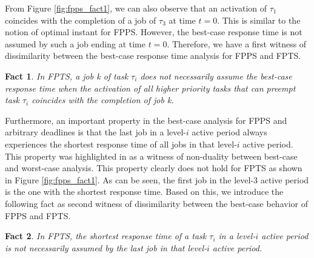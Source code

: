 \documentclass[conference,compsoc]{IEEEtran}
\newtheorem{fact}{Fact}
\begin{document}
From Figure \ref{fig:fpps_fact1}, we can also observe that an activation of $\tau_1$ coincides with the completion of a job of $\tau_3$ at time $t=0$. This is similar to the notion of optimal instant for FPPS. However, the best-case response time is not assumed by such a job ending at time $t=0$. Therefore, we have a first witness of dissimilarity between the best-case response time analysis for FPPS and FPTS.

\begin{fact}
	In FPTS, a job k of task $\tau_i$ does not necessarily assume the best-case response time when the activation of all higher priority tasks that can preempt task $\tau_i$ coincides with the completion of job k.
\end{fact}

Furthermore, an important property in the best-case analysis for FPPS and arbitrary deadlines is that the last job in a level-$i$ active period always experiences the shortest response time of all jobs in that level-$i$ active period. This property was highlighted in \cite{BLM13} as a witness of non-duality between best-case and worst-case analysis. This property clearly does not hold for FPTS as shown in Figure \ref{fig:fpps_fact1}. As can be seen, the first job in the level-3 active period is the one with the shortest response time. Based on this, we introduce the following fact as second witness of dissimilarity between the best-case behavior of FPPS and FPTS.

\begin{fact}
	In FPTS, the shortest response time of a task $\tau_i$ in a level-$i$ active period is not necessarily assumed by the last job in that level-$i$ active period.
\end{fact}





\end{document}
